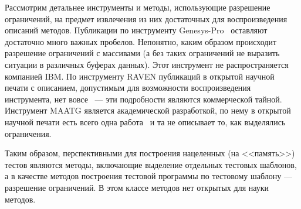 \documentclass[14pt]{extreport}
\begin{document}


Рассмотрим детальнее инструменты и методы, использующие разрешение ограничений, на предмет извлечения из них достаточных для воспроизведения описаний методов. Публикации по инструменту Genesys-Pro~\cite{GenesysPro, GenesysPro2004Innovations, GenesysSolver} оставляют достаточно много важных пробелов. Непонятно, каким образом происходит разрешение ограничений с массивами (а без таких ограничений не выразить ситуации в различных буферах данных). Этот инструмент не распространяется компанией IBM. По инструменту RAVEN публикаций в открытой научной печати с описанием, допустимым для возможности воспроизведения инструмента, нет вовсе~\cite{RAVEN} --- эти подробности являются коммерческой тайной. Инструмент MAATG является академической разработкой, по нему в открытой научной печати есть всего одна работа~\cite{MAATG} и та не описывает то, как выделялись ограничения.

Таким образом, перспективными для построения нацеленных (на <<память>>) тестов являются  методы, включающие выделение отдельных тестовых шаблонов, а в качестве методов построения тестовой программы по тестовому шаблону --- разрешение ограничений. В этом классе методов нет открытых для науки методов.

\end{document}
